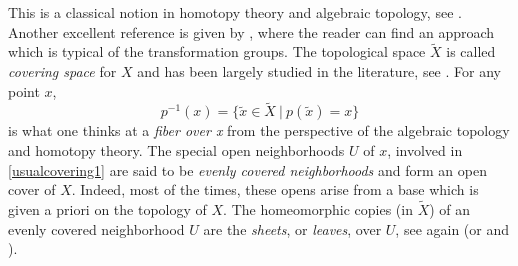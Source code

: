 \documentclass{amsart}
\theoremstyle{definition}
\numberwithin{equation}{section}
\begin{document}
This is a classical notion in homotopy theory and algebraic topology, see \cite[Chapters 17, 19, 20, 21]{kos}. Another excellent reference  is given by \cite[Chapters I, II]{ttd}, where the reader can find an approach which is typical of the  transformation groups. The topological space $\widetilde{X}$ is called \textit{ covering space} for $X$ and has been largely studied in the literature, see \cite[Chapter 10, Appendix 2]{hofmor}. For any point $x$,  \begin{equation}\label{usualcovering2} p^{-1}(x)=\{\widetilde{x} \in \widetilde{X} \ | \ p(\widetilde{x})=x \}\end{equation} is  what one thinks at a \textit{ fiber over x} from the perspective of the algebraic topology and homotopy theory. The special open neighborhoods $U$ of $x$, involved in \eqref{usualcovering1} are said to be \textit{evenly covered neighborhoods} and  form an open cover of  $X$. Indeed, most of the times, these opens arise from a base which is given a priori on the topology of $X$.  The homeomorphic copies (in $\widetilde{X}$) of an evenly covered neighborhood $U$ are  the \textit{sheets}, or \textit{leaves}, over $U$,  see again \cite[Chapters 17, 19, 20, 21]{kos} (or  \cite[Chapters I, II]{ttd} and \cite[Appendix 2]{hofmor}).
\end{document}
